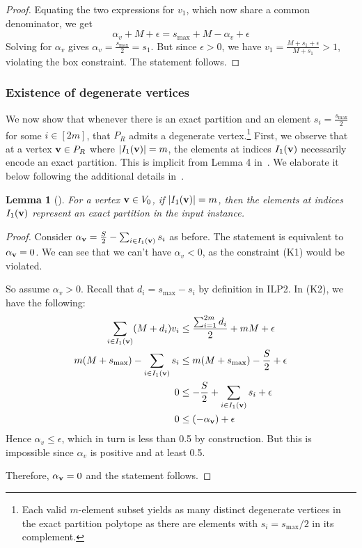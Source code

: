 \documentclass[10pt,a4paper]{amsart}
\newtheorem{lemma}[theorem]{Lemma}
\def\ve#1{\mathchoice{\mbox{\boldmath$\displaystyle\bf#1$}}
{\mbox{\boldmath$\textstyle\bf#1$}}
{\mbox{\boldmath$\scriptstyle\bf#1$}}
{\mbox{\boldmath$\scriptscriptstyle\bf#1$}}}
\begin{document}
\begin{proof}
Equating the two expressions for $v_1$, which now share a common denominator, we get 
$$ \alpha_v + M + \epsilon = s_{\max} + M - \alpha_v +\epsilon$$
Solving for $\alpha_v$ gives $\alpha_v = \displaystyle \frac{s_{\max}}{2} = s_1$.  But since $\epsilon>0$, we have $v_1 = \displaystyle \frac{M + s_1 + \epsilon}{M+s_1} > 1$, violating the box constraint.  The statement follows.



\end{proof}

\subsubsection{Existence of degenerate vertices}
We now show that whenever there is an exact partition and an element $s_i = \frac{s_{\max}}{2}$ for some $i \in [2m]$, that $P_R$ admits a degenerate vertex.\footnote{Each valid $m$-element subset yields as many distinct degenerate vertices in the exact partition polytope as there are elements with $s_i = s_{\max} /2$ in its complement.} 
First, we observe that at a vertex $\ve{v} \in P_R$ where $|I_1(\ve{v})|=m$, the elements at indices $I_1(\ve{v})$ necessarily encode an exact partition. This is implicit from Lemma 4 in~\cite{FT94}.  We elaborate it below following the additional details in~\cite{KN25}. 

\begin{lemma}[\cite{KN25}]\label{epv}
For a vertex $\ve{v}\in V_0$, if $|I_1(\ve{v})|=m$, then the elements at indices $I_1(\ve{v})$ represent an exact partition in the input instance.
\end{lemma} 

\begin{proof}
    

Consider $\alpha_{\ve{v}} = \frac{S}{2} - \sum_{i \in I_1(\ve{v})}s_i$ as before. The statement is equivalent to $\alpha_{\ve{v}} = 0$. 
We can see that we can't have $\alpha_v < 0$, as the constraint (K1) would be violated.

So assume $\alpha_v >0$.
Recall that $d_i = s_{\max}-s_i$ by definition in ILP2. In (K2), we have the following:
        \begin{align*}
            \sum_{i \in I_1(\ve{v})} (M+d_i)v_i &\leq 
               \frac{\sum_{i=1}^{2m} d_i}{2} + mM + \epsilon\\
            m(M + s_{\max}) - \sum_{i \in I_1(\ve{v})}s_i &\leq m(M+s_{\max}) - \frac{S}{2} + \epsilon \\
            0 &\leq -\frac{S}{2} + \sum_{i \in I_1(\ve{v})}s_i + \epsilon\\
            0 &\leq (-\alpha_{\ve{v}}) + \epsilon
         \end{align*}
     Hence $\alpha_v \le \epsilon$, which in turn is less than 0.5 by construction.     But this is impossible since $\alpha_v$ is positive and at least 0.5.
    
    Therefore, $\alpha_{\ve{v}} = 0$ and the statement follows. 
    
\end{proof}
\end{document}
